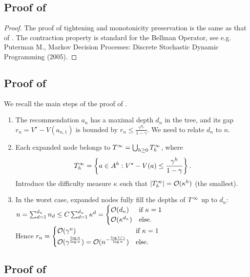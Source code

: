 \documentclass[runningheads]{llncs}
\begin{document}
\subsection{Proof of }
\begin{proof}
The proof of tightening and monotonicity preservation is the same as that of .
The contraction property is standard for the Bellman Operator, see e.g. Puterman M., Markov Decision Processes: Discrete Stochastic Dynamic Programming (2005).
\end{proof}

\subsection{Proof of }
We recall the main steps of the proof of \citet{Hren2008optimistic}.\\

\begin{enumerate}
	\item The recommendation $a_n$ has a maximal depth $d_n$ in the tree, and its gap $r_n = V^\star - V({a_{n,1}})$ is bounded by $r_n \leq \frac{\gamma^{d_n}}{1-\gamma}$. We need to relate $d_n$ to $n$.
	
	\item Each expanded node belongs to $T^\infty = \bigcup_{h\geq 0} T_h^\infty$, where $$T_h^\infty = \left\{a\in A^h: V^\star-V(a) \leq \frac{\gamma^h}{1-\gamma}\right\}.$$ Introduce the difficulty measure $\kappa$ such that $|T_h^\infty| = \mathcal{O}(\kappa^h)$ (the smallest).
	
	\item In the worst case, expanded nodes fully fill the depths of $T^\infty$ up to $d_n$: $n = \sum_{d=1}^{d_n} n_d \leq  C\sum_{d=1}^{d_n} \kappa^d = \begin{cases}
	\mathcal{O}(d_n) &\text{if $\kappa=1$}\\
	\mathcal{O}(\kappa^{d_n}) &\text{else.}
	\end{cases}$\\
	Hence $r_n = \begin{cases}
	\mathcal{O}(\gamma^n) &\text{if $\kappa=1$}\\
	\mathcal{O}(\gamma^{\frac{\log n}{\log \kappa}}) = \mathcal{O}(n^{-\frac{\log 1/\gamma}{\log \kappa}}) &\text{else.}
	\end{cases}$
\end{enumerate}

\subsection{Proof of }
\end{document}
